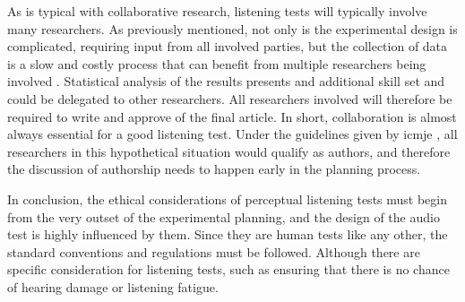 \documentclass{article}
\begin{document}
As is typical with collaborative research, listening tests will typically involve many researchers. As previously mentioned, not only is the experimental design is complicated, requiring input from all involved parties, but the collection of data is a slow and costly process that can benefit from multiple researchers being involved \cite{delgadoDesignChoicesBinaural2023}. Statistical analysis of the results presents and additional skill set and could be delegated to other researchers. All researchers involved will therefore be required to write and approve of the final article. In short, collaboration is almost always essential for a good listening test. Under the guidelines given by \gls{icmje} \cite{icmje_recommendations}, all researchers in this hypothetical situation would qualify as authors, and therefore the discussion of authorship needs to happen early in the planning process.

In conclusion, the ethical considerations of perceptual listening tests must begin from the very outset of the experimental planning, and the design of the audio test is highly influenced by them. Since they are human tests like any other, the standard conventions and regulations must be followed. Although there are specific consideration for listening tests, such as ensuring that there is no chance of hearing damage or listening fatigue.

\printglossaries

\printbibliography

\clearpage
\end{document}
